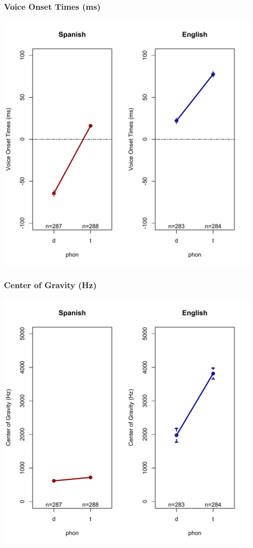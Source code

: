 \documentclass{beamer}
\begin{document}
\begin{frame}
\frametitle{Voice Onset Times (ms)}
\begin{center}
\includegraphics[scale=.375]{simplified/fig01_votmonolinguals.pdf}
\end{center}
\end{frame}

\begin{frame}
\frametitle{Center of Gravity (Hz)}
\begin{center}
\includegraphics[scale=.375]{simplified/fig02_cogmonolinguals.pdf}
\end{center}
\end{frame}
\end{document}
